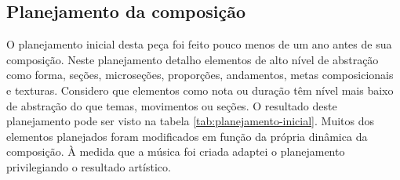 \subsection{Planejamento da composição}
\label{sec:plan-da-comp}

O planejamento inicial desta peça foi feito pouco menos de um ano
antes de sua composição. Neste planejamento detalho elementos de alto
nível de abstração como forma, seções, microseções, proporções,
andamentos, metas composicionais e texturas. Considero que elementos
como nota ou duração têm nível mais baixo de abstração do que temas,
movimentos ou seções. O resultado deste planejamento pode ser visto na
tabela \ref{tab:planejamento-inicial}. Muitos dos elementos planejados
foram modificados em função da própria dinâmica da composição. À
medida que a música foi criada adaptei o planejamento privilegiando o
resultado artístico.

